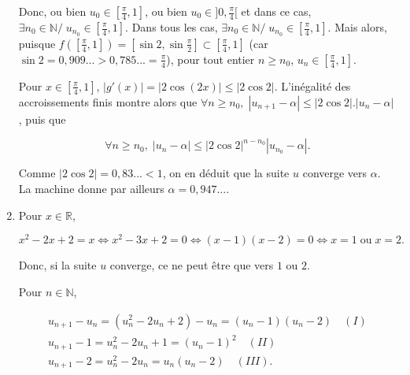 \documentclass[11pt,a4paper]{article}
\newcommand{\Nn}{\mathbb{N}} \newcommand{\N}{\mathbb{N}}
\newcommand{\Rr}{\mathbb{R}} \newcommand{\R}{\mathbb{R}}
\begin{document}
\begin{enumerate}
Donc, ou bien $u_0\in[\frac{\pi}{4},1]$, ou bien $u_0\in]0,\frac{\pi}{4}[$ et dans ce cas, $\exists n_0\in\Nn/\;u_{n_0}\in[\frac{\pi}{4},1]$. Dans tous les cas, $\exists n_0\in\Nn/\;u_{n_0}\in[\frac{\pi}{4},1]$. Mais alors, puisque $f([\frac{\pi}{4},1])=[\sin2,\sin\frac{\pi}{2}]\subset[\frac{\pi}{4},1]$ (car $\sin2=0,909...>0,785...=\frac{\pi}{4}$), pour tout entier $n\geq n_0$, $u_n\in[\frac{\pi}{4},1]$.

Pour $x\in[\frac{\pi}{4},1]$, $|g'(x)|=|2\cos(2x)|\leq|2\cos2|$. L'inégalité des accroissements finis montre alors que $\forall n\geq n_0,\;|u_{n+1}-\alpha|\leq|2\cos2|.|u_n-\alpha|$, puis que 

$$\forall n\geq n_0,\;|u_n-\alpha|\leq|2\cos2|^{n-n_0}|u_{n_0}-\alpha|.$$

Comme $|2\cos2|=0,83...<1$, on en déduit que la suite $u$ converge vers $\alpha$. La machine donne par ailleurs $\alpha=0,947...$.



\item  Pour $x\in\Rr$,

$$x^2-2x+2=x\Leftrightarrow x^2-3x+2=0\Leftrightarrow(x-1)(x-2)=0\Leftrightarrow x=1\;\mbox{ou}\;x=2.$$

Donc, si la suite $u$ converge, ce ne peut être que vers $1$ ou $2$.

Pour $n\in\Nn$,

$$\begin{array}{l}
u_{n+1}-u_n=(u_n^2-2u_n+2)-u_n=(u_n-1)(u_n-2)\quad(I)\\
u_{n+1}-1=u_n^2-2u_n+1=(u_n-1)^2\quad(II)\\
u_{n+1}-2=u_n^2-2u_n=u_n(u_n-2)\quad(III).
\end{array}
$$


\end{enumerate}
\end{document}
